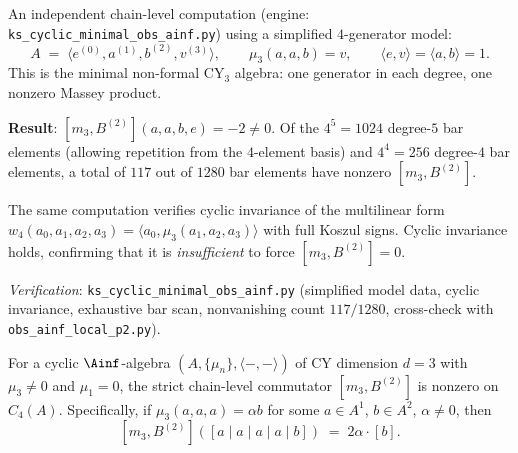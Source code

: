 \begin{computation}
\label{comp:ks-minimal}
An independent chain-level computation (engine:
\texttt{ks\_cyclic\_minimal\_obs\_ainf.py}) using a simplified
$4$-generator model:
\[
 A \;=\; \langle e^{(0)}, a^{(1)}, b^{(2)}, v^{(3)} \rangle,
 \qquad \mu_3(a, a, b) = v, \qquad
 \langle e, v \rangle = \langle a, b \rangle = 1.
\]
This is the minimal non-formal CY$_3$ algebra: one generator
in each degree, one nonzero Massey product.

\textbf{Result}: $[m_3, B^{(2)}](a, a, b, e) = -2 \neq 0$.
Of the $4^5 = 1024$ degree-$5$ bar elements (allowing
repetition from the $4$-element basis) and $4^4 = 256$
degree-$4$ bar elements, a total of $117$ out of $1280$ bar
elements have nonzero $[m_3, B^{(2)}]$.

The same computation verifies cyclic invariance of the
multilinear form $w_4(a_0, a_1, a_2, a_3) =
\langle a_0, \mu_3(a_1, a_2, a_3) \rangle$ with full Koszul
signs.  Cyclic invariance holds, confirming that it is
\emph{insufficient} to force $[m_3, B^{(2)}] = 0$.

\noindent\textit{Verification}: \texttt{ks\_cyclic\_minimal\_obs\_ainf.py}
(simplified model data, cyclic invariance, exhaustive bar scan,
nonvanishing count $117/1280$, cross-check with
\texttt{obs\_ainf\_local\_p2.py}).
\end{computation}

\begin{proposition}
\label{prop:chain-nonvanishing-generic}
\ClaimStatusProvedHere{}
For a cyclic $\Ainf$-algebra $(A, \{\mu_n\}, \langle -,- \rangle)$
of CY dimension $d = 3$ with $\mu_3 \neq 0$ and $\mu_1 = 0$,
the strict chain-level commutator $[m_3, B^{(2)}]$ is nonzero
on $C_4(A)$.  Specifically, if $\mu_3(a, a, a) = \alpha b$ for
some $a \in A^1$, $b \in A^2$, $\alpha \neq 0$, then
\[
 [m_3, B^{(2)}]([a \mid a \mid a \mid a \mid b])
 \;=\; 2\alpha \cdot [b].
\]
\end{proposition}

